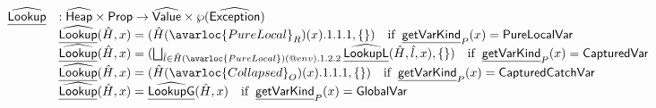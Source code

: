 \[
\begin{array}{ll}
\ahf{Lookup} & : \aHeap \times \SF{Prop} \rightarrow \aValue \times \powerset{\abs{Exception}}\\
& \ahf{Lookup}(\hat{H},x) = (\hat{H}(\avarloc{PureLocal}_R)(x).1.1.1, \set{ }) 
      \quad\ifc{\chf{getVarKind}_P(x) = \SF{PureLocalVar}} \\
& \ahf{Lookup}(\hat{H},x) = (\bigsqcup_{\hat{l}\in\hat{H}(\avarloc{PureLocal})(\varprop{env}).1.2.2} \ahf{LookupL}(\hat{H},\hat{l},x), \set{ })
      \quad\ifc{\chf{getVarKind}_P(x) = \SF{CapturedVar}} \\
& \ahf{Lookup}(\hat{H},x) = (\hat{H}(\avarloc{Collapsed}_O)(x).1.1.1, \set{ }) 
      \quad\ifc{\chf{getVarKind}_P(x) = \SF{CapturedCatchVar}} \\
& \ahf{Lookup}(\hat{H},x) = \ahf{LookupG}(\hat{H},x)
      \quad\ifc{\chf{getVarKind}_P(x) = \SF{GlobalVar}} \\
\\


\end{array}\]
